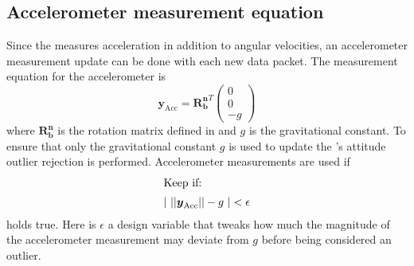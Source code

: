 \subsection{Accelerometer measurement equation}
Since the \abbrIMU measures acceleration in addition to angular velocities, an accelerometer measurement update can be done with each new \abbrIMU data packet. The measurement equation for the accelerometer is
\begin{equation}
\boldsymbol{y}_{\text{Acc}} =
    \boldsymbol{R^n_b}^T
    \begin{pmatrix}
    0\\
    0\\
    -g
    \end{pmatrix}
\end{equation}
    where $\boldsymbol{R^n_b}$ is the rotation matrix defined in  and $g$ is the gravitational constant. To ensure that only the gravitational constant $g$ is used to update the \abbrROV's attitude outlier rejection is performed. Accelerometer measurements are used if 
\begin{align*}
    \intertext{Keep if: }
    |~||
    \boldsymbol{y}_{\text{Acc}}
||
    -g
     ~| < \epsilon
\end{align*} holds true.
Here is $\epsilon$ a design variable that tweaks how much the magnitude of the accelerometer measurement may deviate from $g$ before being considered an outlier.

